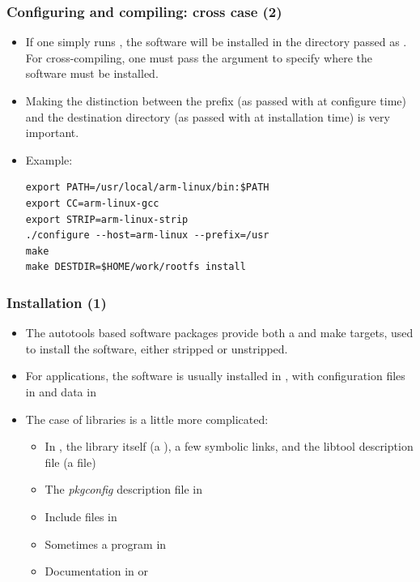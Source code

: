 \begin{frame}[fragile]
  \frametitle{Configuring and compiling: cross case (2)}
  \begin{itemize}
  \item If one simply runs , the software will be
    installed in the directory passed as . For
    cross-compiling, one must pass the  argument to
    specify where the software must be installed.
  \item Making the distinction between the prefix (as passed with
     at configure time) and the destination directory (as
    passed with  at installation time) is very important.
  \item Example:
\small
\begin{block}{}
\begin{verbatim}
export PATH=/usr/local/arm-linux/bin:$PATH
export CC=arm-linux-gcc
export STRIP=arm-linux-strip
./configure --host=arm-linux --prefix=/usr
make
make DESTDIR=$HOME/work/rootfs install
\end{verbatim}
\end{block}
  \end{itemize}
\end{frame}

\begin{frame}
  \frametitle{Installation (1)}
  \begin{itemize}
  \item The autotools based software packages provide both a
     and  make targets, used to
    install the software, either stripped or unstripped.
  \item For applications, the software is usually installed in
    , with configuration files in
     and data in
  \item The case of libraries is a little more complicated:
    \begin{itemize}
    \item In , the library itself (a
      ), a few symbolic links, and
      the libtool description file (a  file)
    \item The {\em pkgconfig} description file in
    \item Include files in 
    \item Sometimes a  program in
    \item Documentation in  or
    \end{itemize}
  \end{itemize}
\end{frame}

